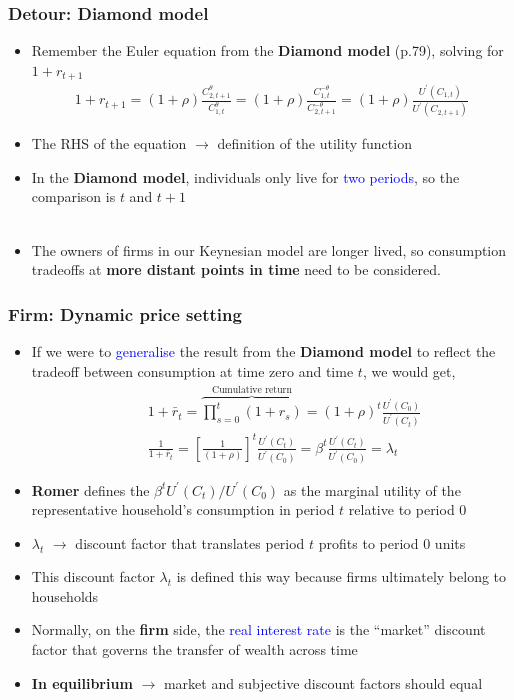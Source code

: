 \documentclass[10pt, xcolor=x11names, table]{beamer}
\begin{document}
\begin{frame}
\frametitle{Detour: Diamond model}
\begin{itemize}
\item Remember the Euler equation from the \textbf{Diamond model} (p.79), solving for $1+r_{t+1}$
\begin{align*}
1+r_{t+1} = (1+\rho)\frac{C^{\theta}_{2,t+1}}{C^{\theta}_{1,t}} = (1+\rho)\frac{C^{-\theta}_{1,t}}{C^{-\theta}_{2,t+1}} = (1+\rho)\frac{U^{\prime}(C_{1,t})}{U^{\prime}(C_{2,t+1})}
\end{align*}
\item The RHS of the equation $\rightarrow$ definition of the utility function
\item In the \textbf{Diamond model}, individuals only live for \textcolor{blue}{two periods}, so the comparison is $t$ and $t+1$ \\~\\
\item The owners of firms in our Keynesian model are longer lived, so consumption tradeoffs at \textbf{more distant points in time} need to be considered.
\end{itemize}
\end{frame}


\begin{frame}
\frametitle{Firm: Dynamic price setting}
\small
\begin{itemize}
\item If we were to \textcolor{blue}{generalise} the result from the \textbf{Diamond model} to reflect the tradeoff between consumption at time zero and time $t$, we would get,
\begin{align*}
&1+\bar{r}_{t} = \overbrace{\prod_{s=0}^{t}(1+r_{s})}^\text{Cumulative return} = (1+\rho)^{t}\frac{U^{\prime}(C_{0})}{U^{\prime}(C_{t})} \\
\quad &\frac{1}{1+\bar{r}_{t}} =\left[\frac{1}{(1+\rho)}\right]^{t}\frac{U^{\prime}(C_{t})}{U^{\prime}(C_{0})}  = \beta^{t}\frac{U^{\prime}(C_{t})}{U^{\prime}(C_{0})} = \lambda_{t}
\end{align*}
\item \textbf{Romer} defines the $\textstyle \beta^{t}U^{\prime}(C_{t})/{U^{\prime}(C_{0})}$ as the marginal utility of the representative household's consumption in period $t$ relative to period 0
\item $\lambda_{t}$ $\rightarrow$ discount factor that translates period $t$ profits to period 0 units
\item This discount factor $\lambda_{t}$ is defined this way because firms ultimately belong to households
\item Normally, on the \textbf{firm} side, the \textcolor{blue}{real interest rate} is the ``market'' discount factor that governs the transfer of wealth across time
\item \textbf{In equilibrium} $\rightarrow$ market and subjective discount factors should equal
\end{itemize}
\end{frame}
\end{document}

